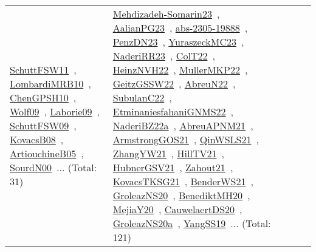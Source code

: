 {\begin{longtable}{lp{3cm}>{\raggedright\arraybackslash}p{6cm}>{\raggedright\arraybackslash}p{6cm}>{\raggedright\arraybackslash}p{8cm}}
\href{../works/SchuttFSW11.pdf}{SchuttFSW11}~\cite{SchuttFSW11}, \href{../works/LombardiMRB10.pdf}{LombardiMRB10}~\cite{LombardiMRB10}, \href{../works/ChenGPSH10.pdf}{ChenGPSH10}~\cite{ChenGPSH10}, \href{../works/Wolf09.pdf}{Wolf09}~\cite{Wolf09}, \href{../works/Laborie09.pdf}{Laborie09}~\cite{Laborie09}, \href{../works/SchuttFSW09.pdf}{SchuttFSW09}~\cite{SchuttFSW09}, \href{../works/KovacsB08.pdf}{KovacsB08}~\cite{KovacsB08}, \href{../works/ArtiouchineB05.pdf}{ArtiouchineB05}~\cite{ArtiouchineB05}, \href{../works/SourdN00.pdf}{SourdN00}~\cite{SourdN00}... (Total: 31) & \href{../works/Mehdizadeh-Somarin23.pdf}{Mehdizadeh-Somarin23}~\cite{Mehdizadeh-Somarin23}, \href{../works/AalianPG23.pdf}{AalianPG23}~\cite{AalianPG23}, \href{../works/abs-2305-19888.pdf}{abs-2305-19888}~\cite{abs-2305-19888}, \href{../works/PenzDN23.pdf}{PenzDN23}~\cite{PenzDN23}, \href{../works/YuraszeckMC23.pdf}{YuraszeckMC23}~\cite{YuraszeckMC23}, \href{../works/NaderiRR23.pdf}{NaderiRR23}~\cite{NaderiRR23}, \href{../works/ColT22.pdf}{ColT22}~\cite{ColT22}, \href{../works/HeinzNVH22.pdf}{HeinzNVH22}~\cite{HeinzNVH22}, \href{../works/MullerMKP22.pdf}{MullerMKP22}~\cite{MullerMKP22}, \href{../works/GeitzGSSW22.pdf}{GeitzGSSW22}~\cite{GeitzGSSW22}, \href{../works/AbreuN22.pdf}{AbreuN22}~\cite{AbreuN22}, \href{../works/SubulanC22.pdf}{SubulanC22}~\cite{SubulanC22}, \href{../works/EtminaniesfahaniGNMS22.pdf}{EtminaniesfahaniGNMS22}~\cite{EtminaniesfahaniGNMS22}, \href{../works/NaderiBZ22a.pdf}{NaderiBZ22a}~\cite{NaderiBZ22a}, \href{../works/AbreuAPNM21.pdf}{AbreuAPNM21}~\cite{AbreuAPNM21}, \href{../works/ArmstrongGOS21.pdf}{ArmstrongGOS21}~\cite{ArmstrongGOS21}, \href{../works/QinWSLS21.pdf}{QinWSLS21}~\cite{QinWSLS21}, \href{../works/ZhangYW21.pdf}{ZhangYW21}~\cite{ZhangYW21}, \href{../works/HillTV21.pdf}{HillTV21}~\cite{HillTV21}, \href{../works/HubnerGSV21.pdf}{HubnerGSV21}~\cite{HubnerGSV21}, \href{../works/Zahout21.pdf}{Zahout21}~\cite{Zahout21}, \href{../works/KovacsTKSG21.pdf}{KovacsTKSG21}~\cite{KovacsTKSG21}, \href{../works/BenderWS21.pdf}{BenderWS21}~\cite{BenderWS21}, \href{../works/GroleazNS20.pdf}{GroleazNS20}~\cite{GroleazNS20}, \href{../works/BenediktMH20.pdf}{BenediktMH20}~\cite{BenediktMH20}, \href{../works/MejiaY20.pdf}{MejiaY20}~\cite{MejiaY20}, \href{../works/CauwelaertDS20.pdf}{CauwelaertDS20}~\cite{CauwelaertDS20}, \href{../works/GroleazNS20a.pdf}{GroleazNS20a}~\cite{GroleazNS20a}, \href{../works/YangSS19.pdf}{YangSS19}~\cite{YangSS19}... (Total: 121)\\

\end{longtable}}
